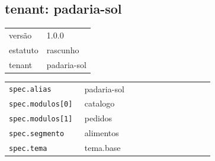 \subsection*{tenant: padaria-sol}
\begin{tabular}{@{}ll@{}}
versão & 1.0.0 \\
estatuto & rascunho \\
tenant & padaria-sol \\
\end{tabular}

\begin{tabular}{@{}p{0.35\linewidth}p{0.6\linewidth}@{}}
\texttt{spec.alias} & padaria-sol \\
\texttt{spec.modulos[0]} & catalogo \\
\texttt{spec.modulos[1]} & pedidos \\
\texttt{spec.segmento} & alimentos \\
\texttt{spec.tema} & tema.base \\
\end{tabular}

